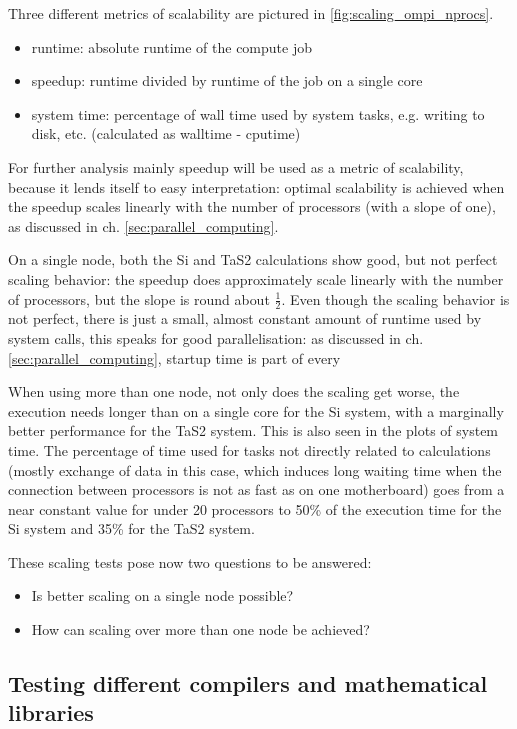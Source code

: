 \documentclass[main.tex]{subfiles}
\begin{document}

Three different metrics of scalability are pictured in \ref{fig:scaling_ompi_nprocs}.
\begin{itemize}
    \item runtime: absolute runtime of the compute job
    \item speedup: runtime divided by runtime of the job on a single core
    \item system time: percentage of wall time used by system tasks, e.g. writing to disk, etc. (calculated as walltime - cputime)
\end{itemize}
For further analysis mainly speedup will be used as a metric of scalability, because it lends itself to easy interpretation: optimal scalability is achieved when the speedup scales linearly with the number of processors (with a slope of one), as discussed in ch. \ref{sec:parallel_computing}.

On a single node, both the Si and TaS2 calculations show good, but not perfect scaling behavior: the speedup does approximately scale linearly with the number of processors, but the slope is round about \(\frac{1}{2}\).
Even though the scaling behavior is not perfect, there is just a small, almost constant amount of runtime used by system calls, this speaks for good parallelisation: as discussed in ch. \ref{sec:parallel_computing}, startup time is part of every 

When using more than one node, not only does the scaling get worse, the execution needs longer than on a single core for the Si system, with a marginally better performance for the TaS2 system.
This is also seen in the plots of system time. The percentage of time used for tasks not directly related to calculations (mostly exchange of data in this case, which induces long waiting time when the connection between processors is not as fast as on one motherboard) goes from a near constant value for under 20 processors to 50\% of the execution time for the Si system and 35\% for the TaS2 system.

These scaling tests pose now two questions to be answered:
\begin{itemize}
    \item Is better scaling on a single node possible?
    \item How can scaling over more than one node be achieved?
\end{itemize}

\subsection{Testing different compilers and mathematical libraries}
\end{document}
